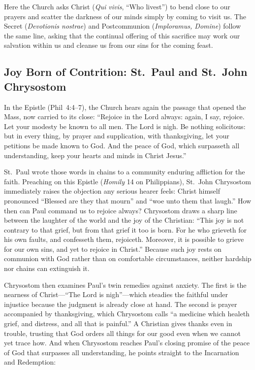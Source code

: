 Here the Church asks Christ (\textit{Qui vivis}, ``Who livest'') to bend
close to our prayers and scatter the darkness of our minds simply by
coming to visit us. The Secret (\textit{Devotionis nostrae}) and
Postcommunion (\textit{Imploramus, Domine}) follow the same line, asking
that the continual offering of this sacrifice may work our salvation
within us and cleanse us from our sins for the coming feast.

\subsection{Joy Born of Contrition: St.~Paul and St.~John Chrysostom}

In the Epistle (Phil~4:4--7), the Church hears again the passage that
opened the Mass, now carried to its close: ``Rejoice in the Lord always:
again, I say, rejoice. Let your modesty be known to all men. The Lord is
nigh. Be nothing solicitous: but in every thing, by prayer and
supplication, with thanksgiving, let your petitions be made known to
God. And the peace of God, which surpasseth all understanding, keep your
hearts and minds in Christ Jesus.''

St.~Paul wrote those words in chains to a community enduring affliction
for the faith. Preaching on this Epistle (\textit{Homily} 14 on
Philippians), St.~John Chrysostom immediately raises the objection any
serious hearer feels: Christ himself pronounced ``Blessed are they that
mourn'' and ``woe unto them that laugh.'' How then can Paul command us
to rejoice always? Chrysostom draws a sharp line between the laughter of
the world and the joy of the Christian: ``This joy is not contrary to
that grief, but from that grief it too is born. For he who grieveth for
his own faults, and confesseth them, rejoiceth. Moreover, it is possible
to grieve for our own sins, and yet to rejoice in Christ.'' Because such
joy rests on communion with God rather than on comfortable
circumstances, neither hardship nor chains can extinguish it.

Chrysostom then examines Paul's twin remedies against anxiety. The first
is the nearness of Christ---``The Lord is nigh''---which steadies the
faithful under injustice because the judgment is already close at hand.
The second is prayer accompanied by thanksgiving, which Chrysostom calls
``a medicine which healeth grief, and distress, and all that is
painful.'' A Christian gives thanks even in trouble, trusting that God
orders all things for our good even when we cannot yet trace how. And
when Chrysostom reaches Paul's closing promise of the peace of God that
surpasses all understanding, he points straight to the Incarnation and
Redemption:

